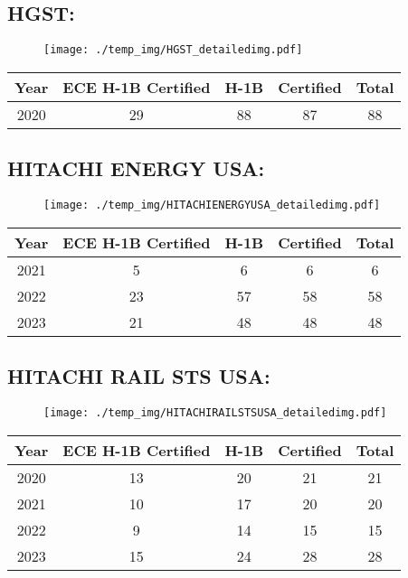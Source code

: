 \documentclass{article}%
\begin{document}
%
\newpage%
\subsection{HGST:}%
\label{subsec:HGST}%
\label{HGSTdetailed}%


\begin{figure}[htbp]%
\centering%
\texttt{[image: ./temp\_img/HGST\_detailedimg.pdf]}%
\end{figure}

%
\begin{longtable}{c|c|c|c|c}%
\hline%
Year&ECE H{-}1B Certified&H{-}1B&Certified&Total\\%
\hline%
2020&29&88&87&88\\%
\hline%
\end{longtable}

%
\newpage%
\subsection{HITACHI ENERGY USA:}%
\label{subsec:HITACHIENERGYUSA}%
\label{HITACHIENERGYUSAdetailed}%


\begin{figure}[htbp]%
\centering%
\texttt{[image: ./temp\_img/HITACHIENERGYUSA\_detailedimg.pdf]}%
\end{figure}

%
\begin{longtable}{c|c|c|c|c}%
\hline%
Year&ECE H{-}1B Certified&H{-}1B&Certified&Total\\%
\hline%
2021&5&6&6&6\\%
\hline%
2022&23&57&58&58\\%
\hline%
2023&21&48&48&48\\%
\hline%
\end{longtable}

%
\newpage%
\subsection{HITACHI RAIL STS USA:}%
\label{subsec:HITACHIRAILSTSUSA}%
\label{HITACHIRAILSTSUSAdetailed}%


\begin{figure}[htbp]%
\centering%
\texttt{[image: ./temp\_img/HITACHIRAILSTSUSA\_detailedimg.pdf]}%
\end{figure}

%
\begin{longtable}{c|c|c|c|c}%
\hline%
Year&ECE H{-}1B Certified&H{-}1B&Certified&Total\\%
\hline%
2020&13&20&21&21\\%
\hline%
2021&10&17&20&20\\%
\hline%
2022&9&14&15&15\\%
\hline%
2023&15&24&28&28\\%
\hline%
\end{longtable}
\end{document}
